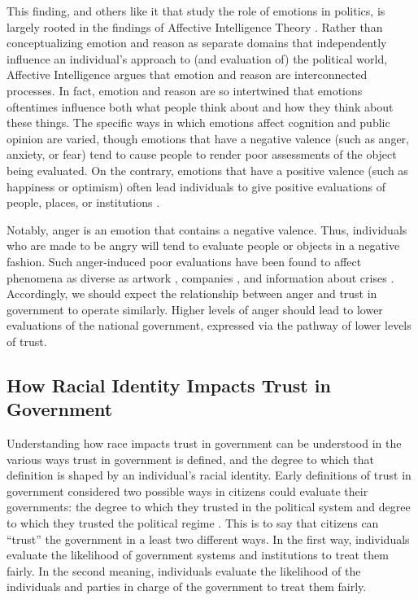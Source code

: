 \documentclass[12t, letterpaper]{article}
\begin{document}
This finding, and others like it that study the role of emotions in politics, is largely rooted in the findings of Affective Intelligence Theory \citep{marcus_etal2000}. Rather than conceptualizing emotion and reason as separate domains that independently influence an individual's approach to (and evaluation of) the political world, Affective Intelligence argues that emotion and reason are interconnected processes. In fact, emotion and reason are so intertwined that emotions oftentimes influence both what people think about and how they think about these things. The specific ways in which emotions affect cognition and public opinion are varied, though emotions that have a negative valence (such as anger, anxiety, or fear) tend to cause people to render poor assessments of the object being evaluated. On the contrary, emotions that have a positive valence (such as happiness or optimism) often lead individuals to give positive evaluations of people, places, or institutions \citep{bower1991}.

Notably, anger is an emotion that contains a negative valence. Thus, individuals who are made to be angry will tend to evaluate people or objects in a negative fashion. Such anger-induced poor evaluations have been found to affect phenomena as diverse as artwork \citep{silvia2009looking}, companies \citep{bennett1997anger}, and information about crises \citep{kim2011emotions}. Accordingly, we should expect the relationship between anger and trust in government to operate similarly. Higher levels of anger should lead to lower evaluations of the national government, expressed via the pathway of lower levels of trust.

\subsection{How Racial Identity Impacts Trust in Government}
\label{subsec:racetrust}

Understanding how race impacts trust in government can be understood in the various ways trust in government is defined, and the degree to which that definition is shaped by an individual's racial identity. Early definitions of trust in government considered two possible ways in citizens could evaluate their governments: the degree to which they trusted in the political system and degree to which they trusted the political regime \citep{easton1965}. This is to say that citizens can ``trust'' the government in a least two different ways. In the first way, individuals evaluate the likelihood of government systems and institutions to treat them fairly. In the second meaning, individuals evaluate the likelihood of the individuals and parties in charge of the government to treat them fairly. 
\end{document}
